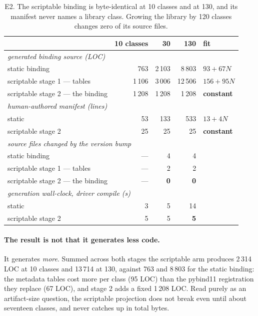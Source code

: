 \documentclass[11pt,a4paper]{article}
\begin{document}
\begin{table}[h]
\centering\small
\begin{tabular}{lrrrl}
\toprule
 & 10 classes & 30 & 130 & fit \\
\midrule
\multicolumn{5}{l}{\itshape generated binding source (LOC)} \\
static binding                     & 763 & 2\,103 & 8\,803 & $93 + 67N$ \\
scriptable stage 1 --- tables      & 1\,106 & 3\,006 & 12\,506 & $156 + 95N$ \\
scriptable stage 2 --- the binding & 1\,208 & 1\,208 & 1\,208 & \textbf{constant} \\
\midrule
\multicolumn{5}{l}{\itshape human-authored manifest (lines)} \\
static                             & 53 & 133 & 533 & $13 + 4N$ \\
scriptable stage 2                 & 25 & 25 & 25 & \textbf{constant} \\
\midrule
\multicolumn{5}{l}{\itshape source files changed by the version bump} \\
static binding                     & --- & 4 & 4 & \\
scriptable stage 1 --- tables      & --- & 2 & 2 & \\
scriptable stage 2 --- the binding & --- & \textbf{0} & \textbf{0} & \\
\midrule
\multicolumn{5}{l}{\itshape generation wall-clock, driver compile (s)} \\
static                             & 3 & 5 & 14 & \\
scriptable stage 2                 & 5 & 5 & \textbf{5} & \\
\bottomrule
\end{tabular}
\caption{E2. The scriptable binding is byte-identical at 10 classes and at 130,
and its manifest never names a library class. Growing the library by 120 classes
changes zero of its source files.}
\label{tab:e2}
\end{table}

\paragraph{The result is not that it generates less code.} It generates
\emph{more}. Summed across both stages the scriptable arm produces 2\,314 LOC at
10 classes and 13\,714 at 130, against 763 and 8\,803 for the static binding:
the metadata tables cost more per class (95 LOC) than the pybind11 registration
they replace (67 LOC), and stage 2 adds a fixed 1\,208 LOC. Read purely as an
artifact-size question, the scriptable projection does not break even until
about seventeen classes, and never catches up in total bytes.
\end{document}
